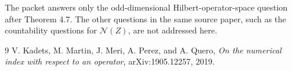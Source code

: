 \documentclass[11pt]{article}
\begin{document}
The packet answers only the odd-dimensional Hilbert-operator-space question
after Theorem 4.7.  The other questions in the same source paper, such as the
countability questions for $\mathcal N(Z)$, are not addressed here.

\begin{thebibliography}{9}
V. Kadets, M. Martin, J. Meri, A. Perez, and A. Quero,
\emph{On the numerical index with respect to an operator},
arXiv:1905.12257, 2019.
\end{thebibliography}
\end{document}
